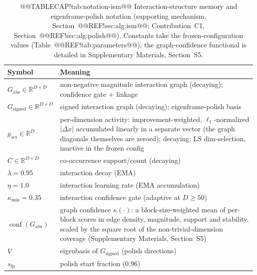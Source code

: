 \documentclass[10pt,a4paper]{article}
\begin{document}
\begin{table}[t]
\caption{@@TABLECAP!tab:notation-ism@@ Interaction-structure memory and eigenframe-polish notation
(supporting mechanism, Section~@@REF!sec:alg:ism@@; Contribution~C1,
Section~@@REF!sec:alg:polish@@). Constants take the frozen-configuration values
(Table~@@REF!tab:parameters@@); the graph-confidence functional is detailed in
Supplementary Materials, Section~S5.}
\label{tab:notation-ism}
\footnotesize
\begin{tabular}{@{}l@{\hspace{1.2em}}p{}@{}}
\toprule
\textbf{Symbol} & \textbf{Meaning}\\
\midrule
$G_{\mathrm{abs}}\in\mathbb{R}^{D\times D}$ & non-negative magnitude interaction graph (decaying); confidence gate + linkage\\
$G_{\mathrm{signed}}\in\mathbb{R}^{D\times D}$ & signed interaction graph (decaying); eigenframe-polish basis\\
$g_{\mathrm{act}}\in\mathbb{R}^{D}$ & per-dimension activity: improvement-weighted, $\ell_1$-normalized $\lvert\Delta x\rvert$ accumulated linearly in a separate vector (the graph diagonals themselves are zeroed); decaying; LS dim-selection, inactive in the frozen config\\
$C\in\mathbb{R}^{D\times D}$ & co-occurrence support/count (decaying)\\
$\lambda=0.95$ & interaction decay (EMA)\\
$\eta=1.0$ & interaction learning rate (EMA accumulation)\\
$\kappa_{\min}=0.35$ & interaction confidence gate (adaptive at $D\ge50$)\\
$\operatorname{conf}(G_{\mathrm{abs}})$ & graph confidence $\kappa(\cdot)$: a block-size-weighted mean of per-block scores in edge density, magnitude, support and stability, scaled by the square root of the non-trivial-dimension coverage (Supplementary Materials, Section~S5)\\
$V$ & eigenbasis of $G_{\mathrm{signed}}$ (polish directions)\\
$s_{\text{fp}}$ & polish start fraction ($0.96$)\\
\bottomrule
\end{tabular}
\end{table}
\end{document}
